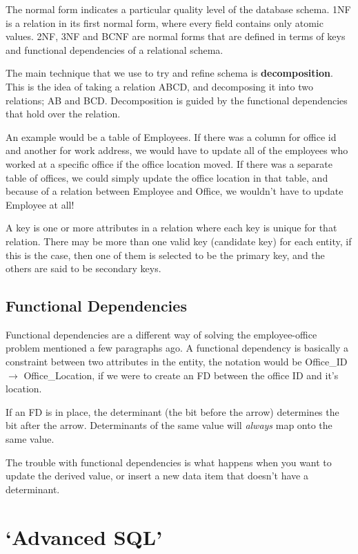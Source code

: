 
The normal form indicates a particular quality level of the database schema. 1NF
is a relation in its first normal form, where every field contains only atomic
values. 2NF, 3NF and BCNF are normal forms that are defined in terms of keys and
functional dependencies of a relational schema.

The main technique that we use to try and refine schema is
\textbf{decomposition}. This is the idea of taking a relation ABCD, and
decomposing it into two relations; AB and BCD. Decomposition is guided by the
functional dependencies that hold over the relation.

An example would be a table of Employees. If there was a column for office id
and another for work address, we would have to update all of the employees who
worked at a specific office if the office location moved. If there was a
separate table of offices, we could simply update the office location in that
table, and because of a relation between Employee and Office, we wouldn't have
to update Employee at all!

A key is one or more attributes in a relation where each key is unique for
that relation. There may be more than one valid key (candidate key) for each
entity, if this is the case, then one of them is selected to be the primary
key, and the others are said to be secondary keys.

\subsection{Functional Dependencies}

Functional dependencies are a different way of solving the employee-office
problem mentioned a few paragraphs ago. A functional dependency is basically a
constraint between two attributes in the entity, the notation would be
Office\_ID $\rightarrow$ Office\_Location, if we were to create an FD between
the office ID and it's location.

If an FD is in place, the determinant (the bit before the arrow) determines the
bit after the arrow. Determinants of the same value will \textit{always} map
onto the same value.

The trouble with functional dependencies is what happens when you want to
update the derived value, or insert a new data item that doesn't have a
determinant.

\section{`Advanced SQL'}

